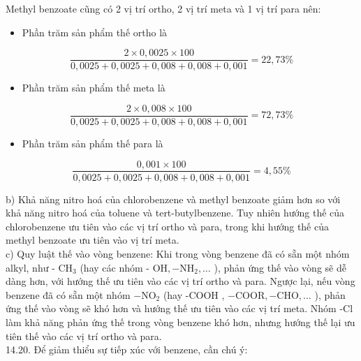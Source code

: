 \documentclass[10pt]{article}
\begin{document}
Methyl benzoate cũng có 2 vị trí ortho, 2 vị trí meta và 1 vị trí para nên:

\begin{itemize}
  \item Phần trăm sản phẩm thế ortho là
\end{itemize}

$$
\frac{2 \times 0,0025 \times 100}{0,0025+0,0025+0,008+0,008+0,001}=22,73 \%
$$

\begin{itemize}
  \item Phần trăm sản phẩm thế meta là
\end{itemize}

$$
\frac{2 \times 0,008 \times 100}{0,0025+0,0025+0,008+0,008+0,001}=72,73 \%
$$

\begin{itemize}
  \item Phần trăm sản phẩm thế para là
\end{itemize}

$$
\frac{0,001 \times 100}{0,0025+0,0025+0,008+0,008+0,001}=4,55 \%
$$

b) Khả năng nitro hoá của chlorobenzene và methyl benzoate giảm hơn so với khả năng nitro hoá của toluene và tert-butylbenzene. Tuy nhiên hướng thế của chlorobenzene ưu tiên vào các vị trí ortho và para, trong khi hướng thế của methyl benzoate ưu tiên vào vị trí meta.\\
c) Quy luật thế vào vòng benzene: Khi trong vòng benzene đã có sẵn một nhóm alkyl, như - $\mathrm{CH}_{3}$ (hay các nhóm - $\mathrm{OH},-\mathrm{NH}_{2}, \ldots$ ), phản ứng thế vào vòng sẽ dễ dàng hơn, với hướng thế ưu tiên vào các vị trí ortho và para. Ngược lại, nếu vòng benzene đã có sẵn một nhóm $-\mathrm{NO}_{2}$ (hay -COOH , $-\mathrm{COOR},-\mathrm{CHO}, \ldots$ ), phản ứng thế vào vòng sẽ khó hơn và hướng thế ưu tiên vào các vị trí meta. Nhóm -Cl làm khả năng phản ứng thế trong vòng benzene khó hơn, nhưng hướng thế lại ưu tiên thế vào các vị trí ortho và para.\\
14.20. Để giảm thiểu sự tiếp xúc với benzene, cần chú ý:
\end{document}
